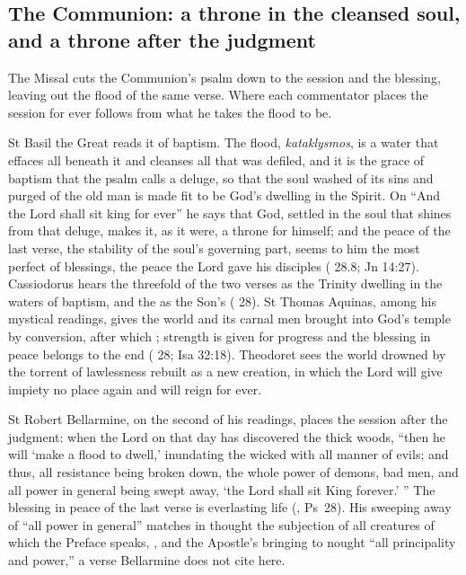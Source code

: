 \subsection{The Communion: a throne in the cleansed soul, and a throne after
the judgment}
\label{sec:handed-communion}

The Missal cuts the Communion's psalm down to the session and the blessing,
leaving out the flood of the same verse. Where each commentator places the
session for ever follows from what he takes the flood to be.

St Basil the Great reads it of baptism. The flood, \textit{kataklysmos}, is a
water that effaces all beneath it and cleanses all that was defiled, and it is
the grace of baptism that the psalm calls a deluge, so that the soul washed of its
sins and purged of the old man is made fit to be God's dwelling in the Spirit.
On ``And the Lord shall sit king for ever'' he says that God, settled in the soul
that shines from that deluge, makes it, as it were, a throne for himself; and
the peace of the last verse, the stability of the soul's governing part, seems
to him the most perfect of blessings, the peace the Lord gave his disciples
( 28.8; Jn 14:27). Cassiodorus hears the threefold
 of the two verses as the Trinity dwelling in the waters of
baptism, and the  as the Son's ( 28).
St Thomas Aquinas, among his mystical readings, gives the world and its carnal
men brought into God's temple by conversion, after which ; strength is given for progress and the blessing in peace belongs to
the end ( 28; Isa 32:18). Theodoret sees the world
drowned by the torrent of lawlessness rebuilt as a new creation, in which the
Lord will give impiety no place again and will reign for ever.

St Robert Bellarmine, on the second of his readings, places the session after
the judgment: when the Lord on that day has discovered the thick woods, ``then
he will `make a flood to dwell,' inundating the wicked with all manner of evils;
and thus, all resistance being broken down, the whole power of demons, bad
men, and all power in general being swept away, `the Lord shall sit King
forever.' '' The blessing in peace of the last verse is everlasting life
(, Ps~28). His sweeping away of ``all power in general''
matches in thought the subjection of all creatures of which the Preface speaks,
, and the Apostle's bringing to
nought ``all principality and power,'' a verse Bellarmine does not cite here.

